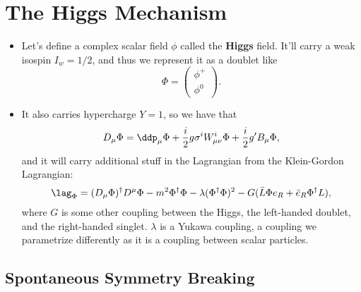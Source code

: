 \section{The Higgs Mechanism}

\begin{itemize}
\item Let's define a complex scalar field $\phi$ called the \textbf{Higgs} field. It'll carry a weak isospin $I_w = 1/2$, and thus we represent it as a doublet like
  \begin{equation}
    \Phi = \begin{pmatrix}\phi^+ \\ \phi^0\end{pmatrix}.
  \end{equation}
\item It also carries hypercharge $Y=1$, so we have that
  \begin{equation}
    D_{\mu}\Phi = \ddp_{\mu}\Phi + \frac{i}{2}g \sigma^iW_{\mu\nu}^i\Phi + \frac{i}{2}g'B_{\mu}\Phi,
  \end{equation}
  and it will carry additional stuff in the Lagrangian from the Klein-Gordon Lagrangian:
  \begin{equation}
    \lag_{\Phi} = (D_{\mu}\Phi)^{\dagger}D^{\mu}\Phi - m^2\Phi^{\dagger}\Phi - \lambda(\Phi^{\dagger}\Phi)^2 - G(\bar{L}\Phi e_R + \bar{e}_R \Phi^{\dagger} L),
  \end{equation}
  where $G$ is some other coupling between the Higgs, the left-handed doublet, and the right-handed singlet. $\lambda$ is a Yukawa coupling, a coupling we parametrize differently as it is a coupling between scalar particles.
\end{itemize}


\subsection{Spontaneous Symmetry Breaking}

